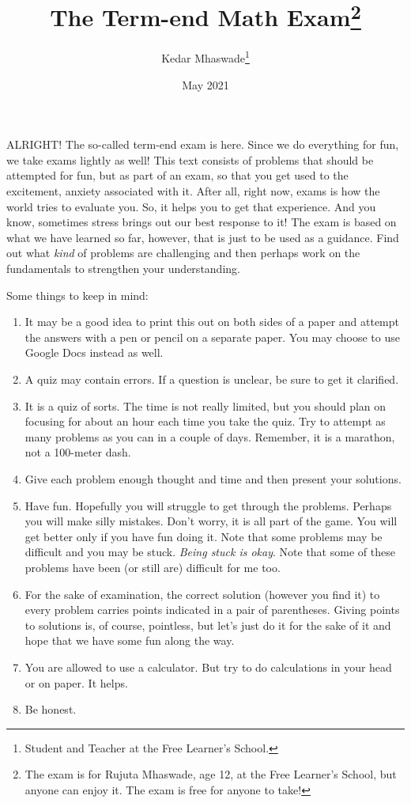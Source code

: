 \documentclass[12pt]{exam}         %
\title{The Term-end Math Exam\footnote{The exam is for Rujuta Mhaswade, age 12, at the Free Learner's School, but anyone can enjoy it. The exam is free for anyone to take!}}
\author{Kedar Mhaswade\footnote{Student and Teacher at the Free Learner's School.}}
\date{May 2021}
\begin{document}
\maketitle

\lettrine[lines=3]{A}{LRIGHT}! The so-called term-end exam is here. Since we do everything for fun, we take exams lightly as well!  This text consists of problems that should be attempted for fun, but as part of an exam, so that you get used to the excitement, anxiety associated with it. After all, right now, exams is how the world tries to evaluate you. So, it helps you to get that experience. And you know, sometimes stress brings out our best response to it! 
The exam is based on what we have learned so far, however, that is just to be used as a guidance. Find out what \emph{kind} of problems are challenging and then perhaps work on the fundamentals to strengthen your understanding.


Some things to keep in mind:
\begin{enumerate}
\item It may be a good idea to print this out on both sides of a paper and attempt the answers with a pen or pencil on a separate paper. You may choose to use Google Docs instead as well. 
\item A quiz may contain errors. If a question is unclear, be sure to get it clarified.
\item It is a quiz of sorts. The time is not really limited, but you should plan on focusing for about an hour each time you take the quiz. Try to attempt as many problems as you can in a couple of days. Remember, it is a marathon, not a 100-meter dash.
\item Give each problem enough thought and time and then present your solutions.
\item Have fun. Hopefully you will struggle to get through the problems. Perhaps you will make silly mistakes. Don't worry, it is all part of the game. You will get better only if you have fun doing it. Note that some problems may be difficult and you may be stuck. \emph{Being stuck is okay}. Note that some of these problems have been (or still are) difficult for me too.
\item For the sake of examination, the correct solution (however you find it) to every problem carries points indicated in a pair of parentheses. Giving points to solutions is, of course, pointless, but let's just do it for the sake of it and hope that we have some fun along the way. 
\item You are allowed to use a calculator. But try to do calculations in your head or on paper. It helps.
\item Be honest.
\end{enumerate}
\end{document}
